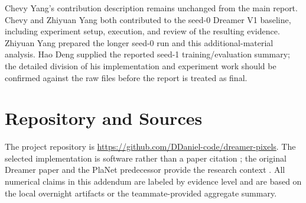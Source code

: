 \documentclass{article}
\begin{document}
Chevy Yang's contribution description remains unchanged from the main report. Chevy and Zhiyuan Yang both contributed to the seed-0 Dreamer V1 baseline, including experiment setup, execution, and review of the resulting evidence. Zhiyuan Yang prepared the longer seed-0 run and this additional-material analysis. Hao Deng supplied the reported seed-1 training/evaluation summary; the detailed division of his implementation and experiment work should be confirmed against the raw files before the report is treated as final.

\section*{Repository and Sources}

The project repository is \url{https://github.com/DDaniel-code/dreamer-pixels}. The selected implementation is software rather than a paper citation \citep{frost_dreamer_pytorch}; the original Dreamer paper and the PlaNet predecessor provide the research context \citep{hafner2020dream,hafner2019latent}. All numerical claims in this addendum are labeled by evidence level and are based on the local overnight artifacts or the teammate-provided aggregate summary.

\begingroup
\footnotesize
\setlength{\bibsep}{0pt}


\endgroup
\end{document}
